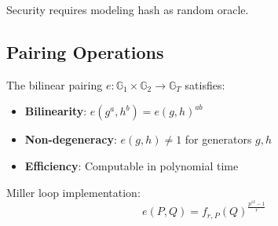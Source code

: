 Security requires modeling hash as random oracle.

\subsection{Pairing Operations}

The bilinear pairing $e: \mathbb{G}_1 \times \mathbb{G}_2 \rightarrow \mathbb{G}_T$ satisfies:
\begin{itemize}
    \item \textbf{Bilinearity}: $e(g^a, h^b) = e(g,h)^{ab}$
    \item \textbf{Non-degeneracy}: $e(g,h) \neq 1$ for generators $g,h$
    \item \textbf{Efficiency}: Computable in polynomial time
\end{itemize}

Miller loop implementation:
\begin{equation}
    e(P,Q) = f_{r,P}(Q)^{\frac{p^{12}-1}{r}}
\end{equation}


